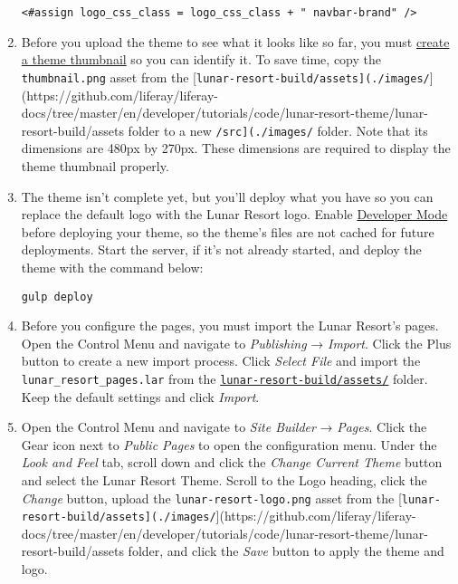\begin{enumerate}
\begin{verbatim}
<#assign logo_css_class = logo_css_class + " navbar-brand" />
\end{verbatim}
\item
  Before you upload the theme to see what it looks like so far, you must
  \href{/docs/7-2/frameworks/-/knowledge_base/f/creating-a-thumbnail-preview-for-your-theme}{create
  a theme thumbnail} so you can identify it. To save time, copy the
  \texttt{thumbnail.png} asset from the
  {[}\texttt{lunar-resort-build/assets{]}(./images/}{]}(https://github.com/liferay/liferay-docs/tree/master/en/developer/tutorials/code/lunar-resort-theme/lunar-resort-build/assets
  folder to a new \texttt{/src{]}(./images/} folder. Note that its
  dimensions are 480px by 270px. These dimensions are required to
  display the theme thumbnail properly.
\item
  The theme isn't complete yet, but you'll deploy what you have so you
  can replace the default logo with the Lunar Resort logo. Enable
  \href{/docs/7-2/frameworks/-/knowledge_base/f/using-developer-mode-with-themes}{Developer
  Mode} before deploying your theme, so the theme's files are not cached
  for future deployments. Start the server, if it's not already started,
  and deploy the theme with the command below:

\begin{verbatim}
gulp deploy
\end{verbatim}
\item
  Before you configure the pages, you must import the Lunar Resort's
  pages. Open the Control Menu and navigate to \emph{Publishing} →
  \emph{Import}. Click the Plus button to create a new import process.
  Click \emph{Select File} and import the
  \texttt{lunar\_resort\_pages.lar} from the
  \href{https://github.com/liferay/liferay-docs/tree/master/en/developer/tutorials/code/lunar-resort-theme/lunar-resort-build/assets}{\texttt{lunar-resort-build/assets/}}
  folder. Keep the default settings and click \emph{Import}.
\item
  Open the Control Menu and navigate to \emph{Site Builder} →
  \emph{Pages}. Click the Gear icon next to \emph{Public Pages} to open
  the configuration menu. Under the \emph{Look and Feel} tab, scroll
  down and click the \emph{Change Current Theme} button and select the
  Lunar Resort Theme. Scroll to the Logo heading, click the
  \emph{Change} button, upload the \texttt{lunar-resort-logo.png} asset
  from the
  {[}\texttt{lunar-resort-build/assets{]}(./images/}{]}(https://github.com/liferay/liferay-docs/tree/master/en/developer/tutorials/code/lunar-resort-theme/lunar-resort-build/assets
  folder, and click the \emph{Save} button to apply the theme and logo.
\end{enumerate}

